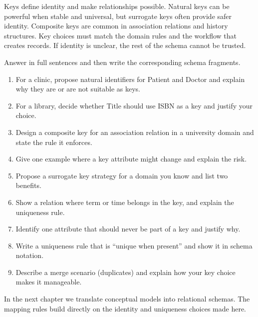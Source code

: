 \begin{chaptersummary}
Keys define identity and make relationships possible.
Natural keys can be powerful when stable and universal, but surrogate keys often provide safer identity.
Composite keys are common in association relations and history structures.
Key choices must match the domain rules and the workflow that creates records.
If identity is unclear, the rest of the schema cannot be trusted.
\end{chaptersummary}

\begin{exercisebox}
Answer in full sentences and then write the corresponding schema fragments.
\begin{enumerate}[label=\arabic*.]
  \item For a clinic, propose natural identifiers for Patient and Doctor and explain why they are or are not suitable as keys.
  \item For a library, decide whether Title should use ISBN as a key and justify your choice.
  \item Design a composite key for an association relation in a university domain and state the rule it enforces.
  \item Give one example where a key attribute might change and explain the risk.
  \item Propose a surrogate key strategy for a domain you know and list two benefits.
  \item Show a relation where term or time belongs in the key, and explain the uniqueness rule.
  \item Identify one attribute that should never be part of a key and justify why.
  \item Write a uniqueness rule that is “unique when present” and show it in schema notation.
  \item Describe a merge scenario (duplicates) and explain how your key choice makes it manageable.
\end{enumerate}
\end{exercisebox}

In the next chapter we translate conceptual models into relational schemas.
The mapping rules build directly on the identity and uniqueness choices made here.
